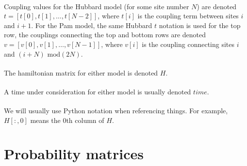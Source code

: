 \\
Coupling values for the Hubbard model (for some site number $N$) are denoted $t=[t[0], t[1],\dots,t[N-2]]$, where $t[i]$ is the coupling term between sites $i$ and $i+1$.
For the Pam model, the same Hubbard $t$ notation is used for the top row, the couplings connecting the top and bottom rows are denoted $v=[v[0], v[1],\dots,v[N-1]]$, where $v[i]$ is the coupling connecting sites $i$ and $(i+N)\text{ mod}(2N)$. \\
\\
The hamiltonian matrix for either model is denoted $H$. \\
\\
A time under consideration for either model is usually denoted $time$. \\
\\
We will usually use Python notation when referencing things.
For example, $H[:,0]$ means the $0$th column of $H$.




\section{Probability matrices}
